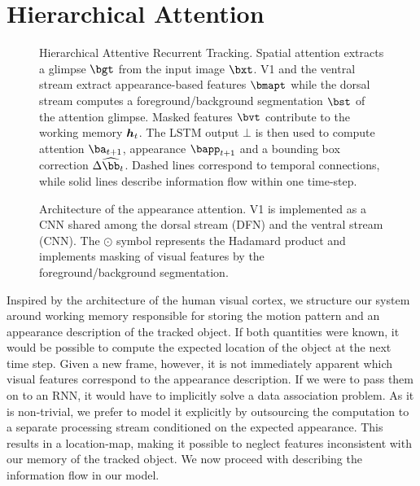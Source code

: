 \section{Hierarchical Attention}
\label{sec:hart_att}


	\begin{figure}[ht]
		\centering
	 	\usebox{\systemfig}
	 	\caption{Hierarchical Attentive Recurrent Tracking. Spatial attention extracts a glimpse $\bgt$ from the input image $\bxt$. V1 and the ventral stream extract appearance-based features $\bmapt$ while the dorsal stream computes a foreground/background segmentation $\bst$ of the attention glimpse. Masked features $\bvt$ contribute to the working memory $\B{h}_t$. The LSTM output $\bot$ is then used to compute attention $\ba_{t+1}$, appearance $\bapp_{t+1}$ and a bounding box correction $\Delta \widehat{\bb}_t$. Dashed lines correspond to temporal connections, while solid lines describe information flow within one time-step.}
		\label{fig:system}
	\end{figure}
	

    \begin{SCfigure}[50]
		\usebox{\archfig}
		\caption{Architecture of the appearance attention. V1 is implemented as a CNN shared among the dorsal stream (DFN) and the ventral stream (CNN). The $\odot$ symbol represents the Hadamard product and implements masking of visual features by the foreground/background segmentation.}
		\label{fig:arch}
	\end{SCfigure}

	Inspired by the architecture of the human visual cortex, we structure our system around working memory responsible for storing the motion pattern and an appearance description of the tracked object. If both quantities were known, it would be possible to compute the expected location of the object at the next time step. Given a new frame, however, it is not immediately apparent which visual features correspond to the appearance description. If we were to pass them on to an RNN, it would have to implicitly solve a data association problem. As it is non-trivial, we prefer to model it explicitly by outsourcing the computation to a separate processing stream conditioned on the expected appearance. This results in a location-map, making it possible to neglect features inconsistent with our memory of the tracked object. We now proceed with describing the information flow in our model.
    
